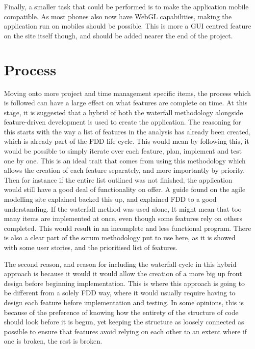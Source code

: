 Finally, a smaller task that could be performed is to make the application mobile compatible. As most phones also now have WebGL capabilities, making the application run on mobiles should be possible. This is more a GUI centred feature on the site itself though, and should be added nearer the end of the project.

\section{Process}
Moving onto more project and time management specific items, the process which is followed can have a large effect on what features are complete on time. At this stage, it is suggested that a hybrid of both the waterfall methodology alongside feature-driven development is used to create the application. The reasoning for this starts with the way a list of features in the analysis has already been created, which is already part of the FDD life cycle. This would mean by following this, it  would be possible to simply iterate over each feature, plan, implement and test one by one. This is an ideal trait that comes from using this methodology which allows the creation of each feature separately, and more importantly by priority. Then for instance if the entire list outlined was not finished, the application would still have a good deal of functionality on offer. A guide found on the agile modelling site\cite{FDD} explained backed this up, and explained FDD to a good understanding. If the waterfall method was used alone, It might mean that too many items are implemented at once, even though some features rely on others completed. This would result in an incomplete and less functional program. There is also a clear part of the scrum methodology put to use here, as it is showed with some user stories, and the prioritised list of features.

The second reason, and reason for including the waterfall cycle in this hybrid approach is because it would it would allow the creation of a more big up front design before beginning implementation. This is where this approach is going to be different from a solely FDD way, where it would usually require having to design each feature before implementation and testing. In some opinions, this is because of the preference of knowing how the entirety of the structure of code should look before it is begun, yet keeping the structure as loosely connected as possible to ensure that features avoid relying on each other to an extent where if one is broken, the rest is broken. 

